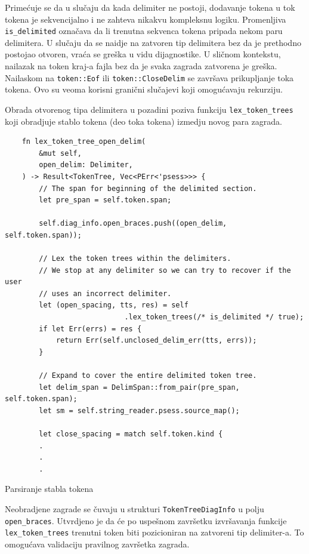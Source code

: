 \documentclass[11pt]{article}
\begin{document}
\newpage

Primećuje se da u slučaju da kada delimiter ne postoji, dodavanje tokena u tok tokena 
je sekvencijalno i ne zahteva nikakvu kompleksnu logiku. Promenljiva \verb|is_delimited|
označava da li trenutna sekvenca tokena pripada nekom paru delimitera. U slučaju da 
se naidje na zatvoren tip delimitera bez da je prethodno postojao otvoren, vraća se greška
u vidu dijagnostike. U sličnom kontekstu, nailazak na token kraj-a fajla bez da je svaka 
zagrada zatvorena je greška. 
Nailaskom na \verb|token::Eof| ili \verb|token::CloseDelim| se završava prikupljanje toka tokena.
Ovo su veoma korisni granični slučajevi koji omogućavaju rekurziju. 

Obrada otvorenog tipa delimitera u pozadini poziva funkciju \verb|lex_token_trees| koji obradjuje
stablo tokena (deo toka tokena) izmedju novog para zagrada.
\begin{listing}[H]
\begin{verbatim}
    fn lex_token_tree_open_delim(
        &mut self,
        open_delim: Delimiter,
    ) -> Result<TokenTree, Vec<PErr<'psess>>> {
        // The span for beginning of the delimited section.
        let pre_span = self.token.span;

        self.diag_info.open_braces.push((open_delim, self.token.span));

        // Lex the token trees within the delimiters.
        // We stop at any delimiter so we can try to recover if the user
        // uses an incorrect delimiter.
        let (open_spacing, tts, res) = self
                            .lex_token_trees(/* is_delimited */ true);
        if let Err(errs) = res {
            return Err(self.unclosed_delim_err(tts, errs));
        }

        // Expand to cover the entire delimited token tree.
        let delim_span = DelimSpan::from_pair(pre_span, self.token.span);
        let sm = self.string_reader.psess.source_map();

        let close_spacing = match self.token.kind {
        .
        .
        .
\end{verbatim}
\caption{Parsiranje stabla tokena}
\end{listing}

Neobradjene zagrade se čuvaju u strukturi \verb|TokenTreeDiagInfo| u polju \verb|open_braces|.
Utvrdjeno je da će po uspešnom završetku izvršavanja funkcije \verb|lex_token_trees| 
trenutni token biti pozicioniran na zatvoreni tip delimiter-a. To omogućava validaciju 
pravilnog završetka zagrada.
\end{document}
